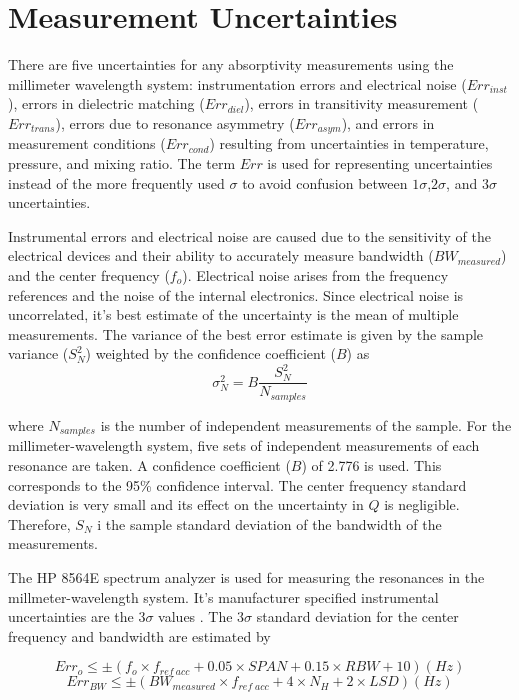 \section{Measurement Uncertainties}


There are five uncertainties for any absorptivity measurements using the millimeter wavelength system: instrumentation errors and electrical noise ($Err_{inst}$), errors in dielectric matching ($Err_{diel}$), errors in transitivity measurement ($Err_{trans}$), errors due to resonance asymmetry ($Err_{asym}$), and errors in measurement conditions ($Err_{cond}$) resulting from uncertainties in temperature, pressure, and mixing ratio. The term $Err$ is used for representing uncertainties instead of the more frequently used $\sigma$ to avoid confusion between $1\sigma$,$2\sigma$, and $3\sigma$ uncertainties.

Instrumental errors and electrical noise are caused due to the sensitivity of the electrical devices and their ability to accurately measure bandwidth ($BW_{measured}$) and the center frequency ($f_o$). Electrical noise arises from the frequency references and the noise of the internal electronics. Since electrical noise is uncorrelated, it's best estimate of the uncertainty is the mean of multiple measurements. The variance of the best error estimate is given by the sample variance ($S^2_N$) weighted by the confidence coefficient ($B$) as
\begin{equation}\label{eq:sigman}
\sigma^2_N = B \frac{S^2_N}{N_{samples}}
\end{equation}

\noindent where $N_{samples}$ is the number of independent measurements of the sample. For the millimeter-wavelength system, five sets of independent measurements of each resonance are taken. A confidence coefficient ($B$) of 2.776 is used. This corresponds to the 95\% confidence interval. The center frequency standard deviation is very small and its effect on the uncertainty in $Q$ is negligible. Therefore, $S_N$ i the sample standard deviation of the bandwidth of the measurements.

The HP 8564E spectrum analyzer is used for measuring the resonances in the millmeter-wavelength system. It's manufacturer specified instrumental uncertainties are the $3\sigma$ values \cite{Hewlett-Packard}. The $3\sigma$ standard deviation for the center frequency and bandwidth are estimated by 

\begin{equation}\label{eq:sigmao}
Err_o \leq \pm (f_o \times f_{ref\:acc} + 0.05 \times SPAN + 0.15 \times RBW +10 ) (Hz)
\end{equation}
\begin{equation}\label{eq:sigmabw}
Err_{BW} \leq \pm (BW_{measured} \times f_{ref\;acc} + 4 \times N_H +2 \times LSD ) (Hz)
\end{equation}

